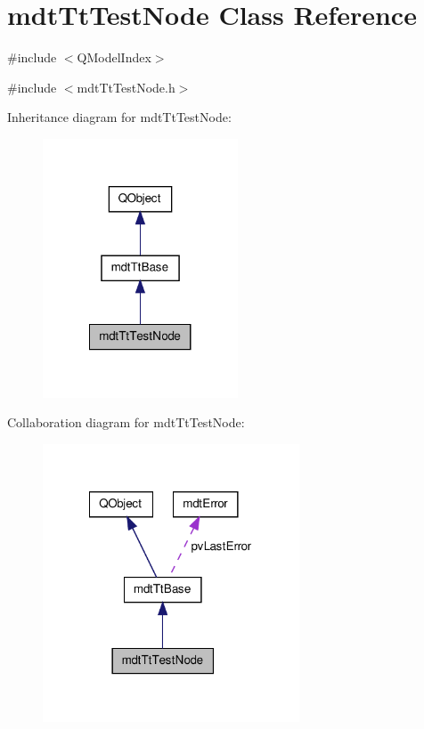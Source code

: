 \hypertarget{classmdt_tt_test_node}{\section{mdt\-Tt\-Test\-Node Class Reference}
\label{classmdt_tt_test_node}
}


\#include $<$\-Q\-Model\-Index$>$  




{\ttfamily \#include $<$mdt\-Tt\-Test\-Node.\-h$>$}



Inheritance diagram for mdt\-Tt\-Test\-Node\-:\nopagebreak
\begin{figure}[H]
\begin{center}
\leavevmode
\includegraphics[width=164pt]{classmdt_tt_test_node__inherit__graph}
\end{center}
\end{figure}


Collaboration diagram for mdt\-Tt\-Test\-Node\-:\nopagebreak
\begin{figure}[H]
\begin{center}
\leavevmode
\includegraphics[width=216pt]{classmdt_tt_test_node__coll__graph}
\end{center}
\end{figure}
